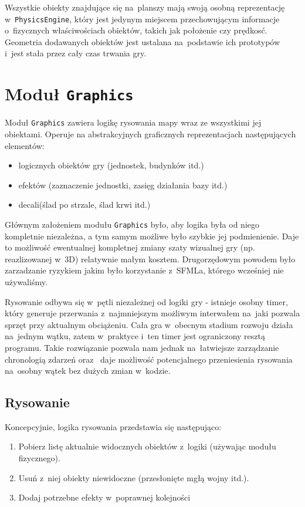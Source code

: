 \documentclass[licencjacka]{pracamgr}
\begin{document}
    Wszystkie obiekty znajdujące się na~planszy mają swoją osobną reprezentację w~\texttt{PhysicsEngine}, który jest jedynym miejscem
    przechowującym informacje o~fizycznych właściwościach obiektów, takich jak położenie czy prędkosć. Geometria dodawanych obiektów
    jest ustalana na~podstawie ich prototypów i~jest stała przez cały czas trwania gry.

  \section{Moduł \texttt{Graphics}}
    Moduł \texttt{Graphics} zawiera logikę rysowania mapy wraz ze wszystkimi jej obiektami. Operuje na
    abstrakcyjnych graficznych reprezentacjach następujących elementów:
    \begin{itemize}
     \item logicznych obiektów gry (jednostek, budynków itd.)
     \item efektów (zaznaczenie jednostki, zasięg działania bazy itd.)
     \item decali\protect\footnotemark (ślad po strzale, ślad krwi itd.)
    \end{itemize}

    Głównym założeniem modułu \texttt{Graphics} było, aby logika była od niego kompletnie niezależna, a tym samym możliwe
    było szybkie jej podmienienie. Daje to możliwość ewentualnej kompletnej zmiany szaty wizualnej gry (np. reazlizowanej w~3D)
    relatywnie małym kosztem. Drugorzędowym powodem było zarzadzanie ryzykiem jakim było korzystanie z~SFMLa, którego wcześniej
    nie używaliśmy.

    Rysowanie odbywa się w~pętli niezależnej od logiki gry - istnieje osobny timer, który generuje
    przerwania z~najmniejszym możliwym interwałem na~jaki pozwala sprzęt przy aktualnym obciążeniu. Cała gra w~obecnym
    stadium rozwoju działa na~jednym wątku, zatem w~praktyce i~ten timer jest ograniczony resztą programu. Takie
    rozwiązanie pozwala nam jednak na~łatwiejsze zarządzanie chronologią zdarzeń oraz~ daje możliwość potencjalnego
    przeniesienia rysowania na~osobny wątek bez dużych zmian w~kodzie.

    \subsection{Rysowanie}
      Koncepcyjnie, logika rysowania przedstawia się następująco:
      \begin{enumerate}
       \item Pobierz listę aktualnie widocznych obiektów z~logiki (używając modułu fizycznego).
       \item Usuń z~niej obiekty niewidoczne (przesłonięte mgłą wojny itd.).
       \item Dodaj potrzebne efekty w~poprawnej kolejności
      \end{enumerate}
\end{document}
